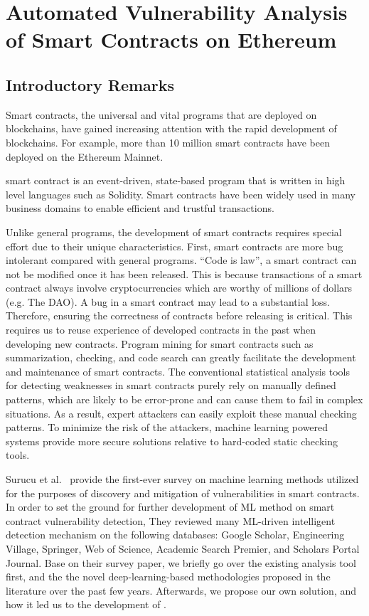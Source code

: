 \chapter{Automated Vulnerability Analysis of Smart Contracts on Ethereum} 
\label{ch:Slither-simil}

\section{Introductory Remarks}
Smart contracts, the universal and vital programs that are deployed on blockchains, have gained increasing attention with the rapid development of blockchains.
For example, more than 10 million smart contracts have been deployed on the Ethereum Mainnet.

smart contract is an event-driven, state-based program that is written in high level languages such as Solidity.
Smart contracts have been widely used in many business domains to enable efficient and trustful transactions.

Unlike general programs, the development of smart contracts requires special effort due to their unique characteristics.
First, smart contracts are more bug intolerant compared with general programs.
“Code is law”, a smart contract can not be modified once it has been released. 
This is because transactions of a smart contract always involve cryptocurrencies which are worthy of millions of dollars (e.g. The DAO). 
A bug in a smart contract may lead to a substantial loss.
Therefore, ensuring the correctness of contracts before releasing is critical.
 This requires us to reuse experience of developed contracts in the past when developing new contracts.
Program mining for smart contracts such as summarization, checking, and code search can greatly facilitate the development and maintenance of smart contracts.
The conventional statistical analysis tools for detecting weaknesses in smart contracts purely rely on manually defined patterns, which are likely to be error-prone and can cause them to fail in complex situations.
As a result, expert attackers can easily exploit these manual checking patterns.
To minimize the risk of the attackers, machine learning powered systems provide more secure solutions relative to hard-coded static checking tools.

Surucu et al.~\cite{surucu2022survey} provide the first-ever survey on machine learning methods utilized for the purposes of discovery and mitigation of vulnerabilities in smart contracts.
In order to set the ground for further development of ML method on smart contract vulnerability detection, They reviewed many ML-driven intelligent detection mechanism on the following databases: Google Scholar, Engineering Village, Springer, Web of Science, Academic Search Premier, and Scholars Portal Journal.
Base on their survey paper, we briefly go over the existing analysis tool first, and the the novel deep-learning-based methodologies proposed in the literature over the past few years.
Afterwards, we propose our own solution, \slithersimil and how it led us to the development of \etherbase.


